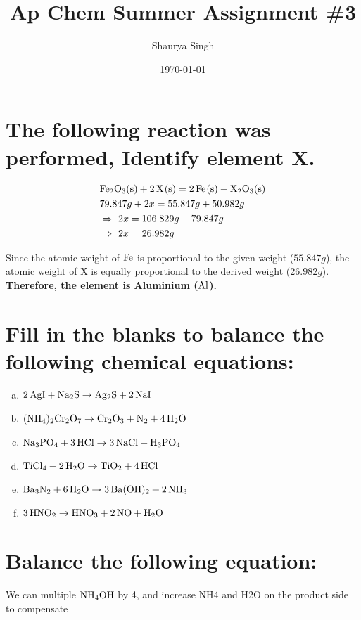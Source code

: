 \documentclass{scrartcl}
\author{Shaurya Singh}
\date{\today}
\title{Ap Chem Summer Assignment \#3}
\begin{document}
\maketitle

\section{The following reaction was performed, Identify element X.}
\label{sec:org107d6dd}
\begin{align*}
  &\ce{Fe2O_3(s)}+\ce{2X(s)} = \ce{2Fe(s) + X_2O_3(s)}\\
  &79.847g+2x=55.847g+50.982g\\
  &\Rightarrow\ 2x=106.829g-79.847g\\
  &\Rightarrow\ 2x=26.982g\\
\end{align*}

Since the atomic weight of \(\ce{Fe}\) is proportional to the given weight
(\(55.847g\)), the atomic weight of X is equally proportional to the derived
weight (\(26.982g\)). \textbf{Therefore, the element is Aluminium (\(\ce{Al}\)).}

\section{Fill in the blanks to balance the following chemical equations:}
\label{sec:org5fb695a}
\begin{enumerate}[a.]
\item \(\ce{2AgI + Na2S} \rightarrow \ce{Ag2S + 2NaI}\)
\item \(\ce{(NH4)2Cr2O7} \rightarrow \ce{Cr2O3}+\ce{N2}+\ce{4H2O}\)
\item \(\ce{Na3PO4}+\ce{3HCl} \rightarrow \ce{3NaCl}+\ce{H3PO4}\)
\item \(\ce{TiCl4}+\ce{2H2O} \rightarrow \ce{TiO2}+\ce{4HCl}\)
\item \(\ce{Ba3N2}+\ce{6H2O} \rightarrow \ce{3Ba(OH)2}+\ce{2NH3}\)
\item \(\ce{3HNO2} \rightarrow \ce{HNO3}+\ce{2NO}+\ce{H2O}\)
\end{enumerate}

\section{Balance the following equation:}
\label{sec:orgcc89537}
We can multiple \(\ce{NH4OH}\) by 4, and increase NH4 and H2O on the product
side to compensate
\end{document}
